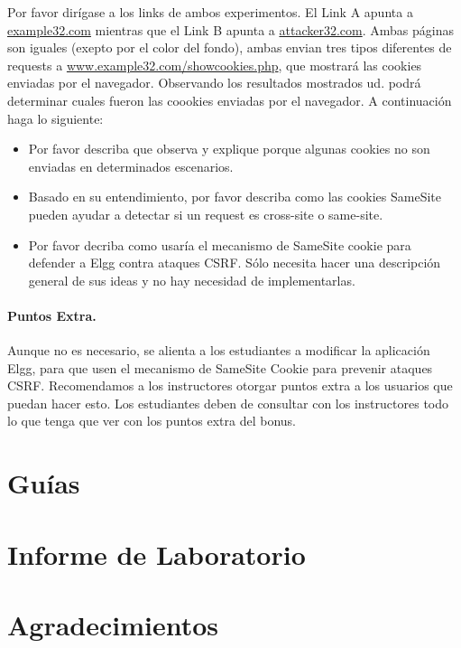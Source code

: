 Por favor dirígase a los links de ambos experimentos. El Link A apunta a \url{example32.com} mientras que el Link B apunta a \url{attacker32.com}. Ambas páginas son iguales (exepto por el color del fondo), ambas envian tres tipos diferentes de requests a \url{www.example32.com/showcookies.php}, que mostrará las cookies enviadas por el navegador. Observando los resultados mostrados ud. podrá determinar cuales fueron las coookies enviadas por el navegador. A continuación haga lo siguiente:


\begin{itemize}
\item Por favor describa que observa y explique porque algunas cookies no son enviadas en determinados escenarios.

\item Basado en su entendimiento, por favor describa como las cookies SameSite pueden ayudar a detectar si un request es cross-site o same-site.


\item Por favor decriba como usaría el mecanismo de SameSite cookie para defender a Elgg contra ataques CSRF. Sólo necesita hacer una descripción general de sus ideas y no hay necesidad de implementarlas.
\end{itemize}


\paragraph{Puntos Extra.} Aunque no es necesario, se alienta a los estudiantes a modificar la aplicación Elgg, para que usen el mecanismo de SameSite Cookie para prevenir ataques CSRF. Recomendamos a los instructores otorgar puntos extra a los usuarios que puedan hacer esto. Los estudiantes deben de consultar con los instructores todo lo que tenga que ver con los puntos extra del bonus.


\section{Guías}





\section{Informe de Laboratorio}




\section*{Agradecimientos}








